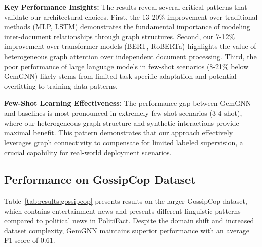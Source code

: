 \textbf{Key Performance Insights:} The results reveal several critical patterns that validate our architectural choices. First, the 13-20\% improvement over traditional methods (MLP, LSTM) demonstrates the fundamental importance of modeling inter-document relationships through graph structures. Second, our 7-12\% improvement over transformer models (BERT, RoBERTa) highlights the value of heterogeneous graph attention over independent document processing. Third, the poor performance of large language models in few-shot scenarios (8-21\% below GemGNN) likely stems from limited task-specific adaptation and potential overfitting to training data patterns.

\textbf{Few-Shot Learning Effectiveness:} The performance gap between GemGNN and baselines is most pronounced in extremely few-shot scenarios (3-4 shot), where our heterogeneous graph structure and synthetic interactions provide maximal benefit. This pattern demonstrates that our approach effectively leverages graph connectivity to compensate for limited labeled supervision, a crucial capability for real-world deployment scenarios.

\subsection{Performance on GossipCop Dataset}

Table~\ref{tab:results:gossipcop} presents results on the larger GossipCop dataset, which contains entertainment news and presents different linguistic patterns compared to political news in PolitiFact. Despite the domain shift and increased dataset complexity, GemGNN maintains superior performance with an average F1-score of 0.61.

